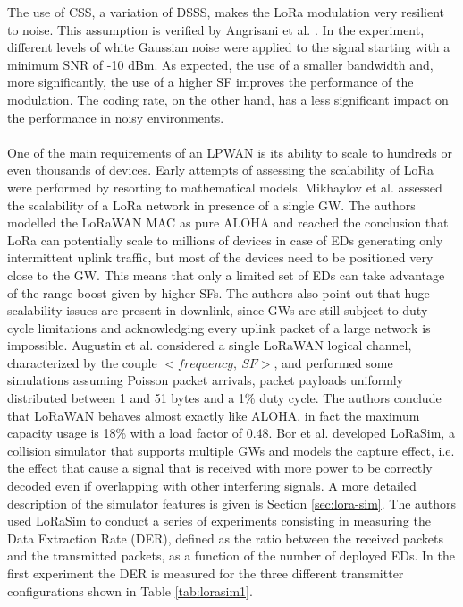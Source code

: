 The use of \gls{CSS}, a variation of \gls{DSSS}, makes the LoRa modulation very resilient to noise. This assumption is verified by Angrisani et al. \cite{ref:soa-lora-noise}. In the experiment, different levels of white Gaussian noise were applied to the signal starting with a minimum SNR of -10 dBm. As expected, the use of a smaller bandwidth and, more significantly, the use of a higher \gls{SF} improves the performance of the modulation. The coding rate, on the other hand, has a less significant impact on the performance in noisy environments. \\ \\
One of the main requirements of an \gls{LPWAN} is its ability to scale to hundreds or even thousands of devices. Early attempts of assessing the scalability of LoRa were performed by resorting to mathematical models. Mikhaylov et al. \cite{ref:soa-lora-scal1} assessed the scalability of a LoRa network in presence of a single \gls{GW}. The authors modelled the LoRaWAN MAC as pure ALOHA and reached the conclusion that LoRa can potentially scale to millions of devices in case of \glspl{ED} generating only intermittent uplink traffic, but most of the devices need to be positioned very close to the \gls{GW}. This means that only a limited set of \glspl{ED} can take advantage of the range boost given by higher \glspl{SF}. The authors also point out that huge scalability issues are present in downlink, since \glspl{GW} are still subject to duty cycle limitations and acknowledging every uplink packet of a large network is 	impossible. Augustin et al. \cite{ref:soa-lora-scal2} considered a single LoRaWAN logical channel, characterized by the couple $<frequency,\ SF>$, and performed some simulations assuming Poisson packet arrivals, packet payloads uniformly distributed between 1 and 51 bytes and a 1\% duty cycle. The authors conclude that LoRaWAN behaves almost exactly like ALOHA, in fact the maximum capacity usage is 18\% with a load factor of 0.48.
Bor et al. \cite{ref:soa-lora-scal3} developed LoRaSim, a collision simulator that supports multiple \glspl{GW} and models the capture effect, i.e. the effect that cause a signal that is received with more power to be correctly decoded even if overlapping with other interfering signals. A more detailed description of the simulator features is given is Section \ref{sec:lora-sim}. The authors used LoRaSim to conduct a series of experiments consisting in measuring the Data Extraction Rate (DER), defined as the ratio between the received packets and the transmitted packets, as a function of the number of deployed \glspl{ED}. In the first experiment the DER is measured for the three different transmitter configurations shown in Table \ref{tab:lorasim1}.


